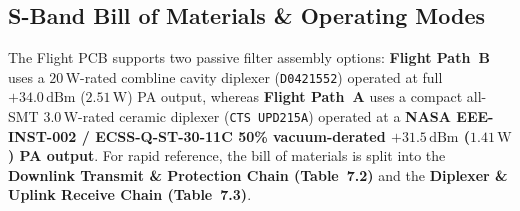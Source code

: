 \documentclass[10pt,a4paper]{article}
\renewcommand{\_}{\origunderscore\penalty0\hskip0pt\relax}
\numberwithin{table}{section}
\numberwithin{figure}{section}
\numberwithin{equation}{section}
\begin{document}
\subsection{S-Band Bill of Materials \& Operating Modes}
The Flight PCB supports two passive filter assembly options: \textbf{Flight Path~B} uses a $20\,\text{W}$-rated combline cavity diplexer (\texttt{D0421552}) operated at full $+34.0\,\text{dBm}$ ($2.51\,\text{W}$) PA output, whereas \textbf{Flight Path~A} uses a compact all-SMT $3.0\,\text{W}$-rated ceramic diplexer (\texttt{CTS UPD215A}) operated at a \textbf{NASA EEE-INST-002 / ECSS-Q-ST-30-11C 50\% vacuum-derated $+31.5\,\text{dBm}$ ($1.41\,\text{W}$) PA output}. For rapid reference, the bill of materials is split into the \textbf{Downlink Transmit \& Protection Chain (\textbf{Table~7.2})} and the \textbf{Diplexer \& Uplink Receive Chain (\textbf{Table~7.3})}.
\end{document}
